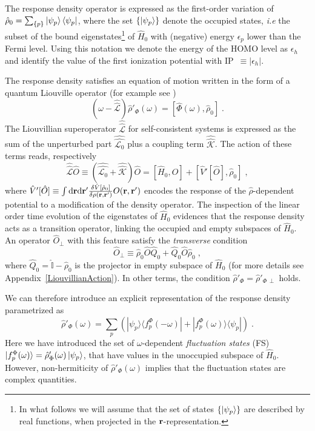 \documentclass[reprint,aps,prb]{revtex4-1}
\newcommand{\dd}{{\rm d}}
\renewcommand{\r}{{\bf r}}
\newcommand{\eps}{\epsilon}
\newcommand{\be}{\begin{equation}}
\newcommand{\ee}{\end{equation}}
\newcommand{\lb}{\label}
\newcommand{\op}[1]{\hat {#1}}
\newcommand{\sop}[1]{\op{\op {#1}}}
\newcommand{\commutator}[2]{\left[ {#1} , {#2} \right]}
\newcommand{\ketbra}[2]{| #1 \rangle \langle #2 |}
\newcommand{\dmnot}{\op{\rho}_0}
\newcommand{\dm}{\op{\rho}}
\newcommand{\hnot}{\op{H}_0}
\newcommand{\Liouv}{\sop{\mathcal L}}
\newcommand{\Liouvnot}{\sop{\mathcal L_0}}
\newcommand{\coupl}{\sop{\mathcal K}}
\newcommand{\identity}{\op{\mathbb I}}
\begin{document}
The response density operator is expressed as the first-order variation of $\dmnot=\sum_{\{p\}} \ket{\psi_p} \bra{\psi_p}$, where the set $\{\ket{\psi_p}\}$ denote the
occupied states, \emph{i.e} the subset of the bound eigenstates\footnote{In what follows we will assume that the set of states $\{\ket{\psi_p}\}$ are described by real
functions, when projected in the $\r$-representation.} of $\hnot$ with (negative) energy $\eps_p$ lower than the Fermi level. Using this notation we denote the energy of the HOMO level
as $\eps_h$ and identify the value of the first ionization potential with IP~$\equiv|\eps_h|$.

The response density satisfies an equation of motion written in the form of a quantum Liouville operator (for example see \cite{baroni2008})
\be\lb{LiouvillianRhopomegaDef1}
\left(\omega - \Liouv\right) \dm'_\Phi(\omega) =  \commutator{\op\Phi(\omega)}{\dmnot} \;.
\ee
The Liouvillian superoperator $\Liouv$ for self-consistent systems is expressed as the sum of the unperturbed part $\Liouvnot$ plus a coupling term $ \coupl$. The action of these
terms reads, respectively
\be\lb{LiouZeroDef1}
\Liouv \op O \equiv \left(\Liouvnot + \coupl \right) \op O = \commutator{\hnot}{\op O} +\commutator{\op V'[\op O]}{\dmnot}  \;,
\ee
where $\op V'[\op O] \equiv \int \dd \r \dd \r'\frac{\delta \op V[\dmnot]}{\delta \rho(\r,\r')} O(\r,\r')$ encodes the response of the $\dm$-dependent potential to a modification of the density operator.
The inspection of the linear order time evolution of the eigenstates of $\hnot$ evidences that the response density acts as a transition
operator, linking the occupied and empty subspaces of $\hnot$.
An operator $\op O_\perp$ with this feature satisfy the \emph{transverse} condition
\be\lb{RhopTransverseDef1}
\op O_\perp \equiv
\dmnot\op O \op Q_0 + \op Q_0 \op O\dmnot \;,
\ee
where $\op Q_0=\identity-\dmnot$ is the projector in empty subspace of $\hnot$
(for more details see Appendix~\ref{LiouvillianAction}).
In other terms, the condition $\dm'_\Phi = \dm'_{\Phi\,\perp}$ holds.

We can therefore introduce an explicit representation of the
response density parametrized as
\be\lb{rhoPrimeFluctuationStateDef1}
\dm'_\Phi(\omega) = \sum_p\left(\ketbra{\psi_p}{f_p^\Phi(-\omega)} + \ketbra{f_p^\Phi(\omega)}{\psi_p}\right) \;.
\ee
Here we have introduced the set of $\omega$-dependent \emph{fluctuation states} (FS)
$\ket{f_p^\Phi(\omega)} = \dm'_\Phi(\omega) \ket{\psi_p}$, that have values in the unoccupied subspace of $\hnot$.
However, non-hermiticity of $\dm'_\Phi(\omega)$ implies that the
fluctuation states are complex quantities.
\end{document}
